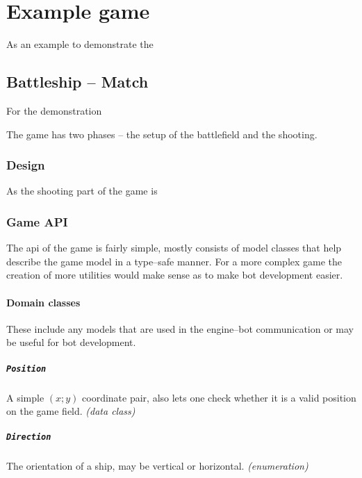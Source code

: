 \documentclass[11pt,a4paper,oneside]{report}
\newcommand{\code}{\texttt}
\begin{document}
\onehalfspacing

\chapter{Example game}\label{sect:Example}

	As an example to demonstrate the 

	\section{Battleship -- Match}

	For the demonstration 

	The game has two phases -- the setup of the battlefield and the shooting. 

		\subsection{Design}
		
		As the shooting part of the game is 

		\subsection{Game API}
		
		The api of the game is fairly simple, mostly consists of model classes that help describe the game model in a type--safe manner. For a more complex game the creation of more utilities would make sense as to make bot development easier. 
		
			\subsubsection{Domain classes}
			
			These include any models that are used in the engine--bot communication or may be useful for bot development.
			
				\paragraph{\code{Position}} A simple $(x; y)$ coordinate pair, also lets one check whether it is a valid position on the game field. \emph{(data class)}
				
				\paragraph{\code{Direction}} The orientation of a ship, may be vertical or horizontal. \emph{(enumeration)}
				
\end{document}
